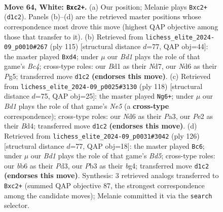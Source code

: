 \documentclass[11pt]{article}
\begin{document}
\clearpage

\begin{figure}[p]\centering
\begin{subfigure}{0.46\textwidth}\centering
\resizebox{\linewidth}{!}{%
\newchessgame
\chessboard[
  setfen={n7/3n4/1b1N2kB/p2p4/8/PP2P2p/2b1P3/3BK3 w - - 9 64},
  showmover=false,
  pgfstyle=straightmove, color=movearrow, markmove={d1-c2}
]}
\caption{}
\end{subfigure}\hfill
\begin{subfigure}{0.46\textwidth}\centering
\resizebox{\linewidth}{!}{%
\newchessgame
\chessboard[
  setfen={8/3n4/4B2p/1kb3p1/1p1PKpP1/7P/1P1B4/8 b - - 1 58},
  showmover=false,
  pgfstyle=straightmove, color=movearrow, markmove={c5-d4}
]}
\caption{}
\end{subfigure}
\\[4pt]
\begin{subfigure}{0.46\textwidth}\centering
\resizebox{\linewidth}{!}{%
\newchessgame
\chessboard[
  setfen={2B5/4k1p1/3b3p/1p2Np1n/1P1BbP2/P6P/5K2/8 w - - 16 60},
  showmover=false,
  pgfstyle=straightmove, color=movearrow, markmove={e5-g6}
]}
\caption{}
\end{subfigure}\hfill
\begin{subfigure}{0.46\textwidth}\centering
\resizebox{\linewidth}{!}{%
\newchessgame
\chessboard[
  setfen={1k1r4/1P4R1/8/3Bp2p/3p2bP/3P4/3KP3/8 w - - 22 64},
  showmover=false,
  pgfstyle=straightmove, color=movearrow, markmove={d5-c6}
]}
\caption{}
\end{subfigure}
\caption{\textbf{Move 64, White: \texttt{Bxc2+}.} (a) Our position; Melanie plays \texttt{Bxc2+} (\texttt{d1c2}). Panels (b)--(d) are the retrieved master positions whose correspondence most drove this move (highest QAP objective among those that transfer to it). (b) Retrieved from \texttt{lichess\_elite\_2024-09\_p0010\#267} (ply 115) [structural distance $d$=77, QAP obj=44]: the master played \texttt{Bxd4}; under $\mu$ our \emph{Bd1} plays the role of that game's \emph{Bc4}; cross-type roles: our \emph{B}d1 as their \emph{N}d7, our \emph{N}d6 as their \emph{P}g5; transferred move \texttt{d1c2} \textbf{(endorses this move)}. (c) Retrieved from \texttt{lichess\_elite\_2024-09\_p0025\#3130} (ply 118) [structural distance $d$=75, QAP obj=25]: the master played \texttt{Ng6+}; under $\mu$ our \emph{Bd1} plays the role of that game's \emph{Ne5} (a \textbf{cross-type} correspondence); cross-type roles: our \emph{N}d6 as their \emph{P}a3, our \emph{P}e2 as their \emph{B}d4; transferred move \texttt{d1c2} \textbf{(endorses this move)}. (d) Retrieved from \texttt{lichess\_elite\_2024-09\_p0031\#3042} (ply 126) [structural distance $d$=77, QAP obj=18]: the master played \texttt{Bc6}; under $\mu$ our \emph{Bd1} plays the role of that game's \emph{Bd5}; cross-type roles: our \emph{b}b6 as their \emph{P}d3, our \emph{P}b3 as their \emph{b}g4; transferred move \texttt{d1c2} \textbf{(endorses this move)}. Synthesis: 3 retrieved analogs transferred to \texttt{Bxc2+} (summed QAP objective 87, the strongest correspondence among the candidate moves); Melanie committed it via the \texttt{search} selector.}
\label{fig:thought-m126}
\end{figure}
\end{document}
